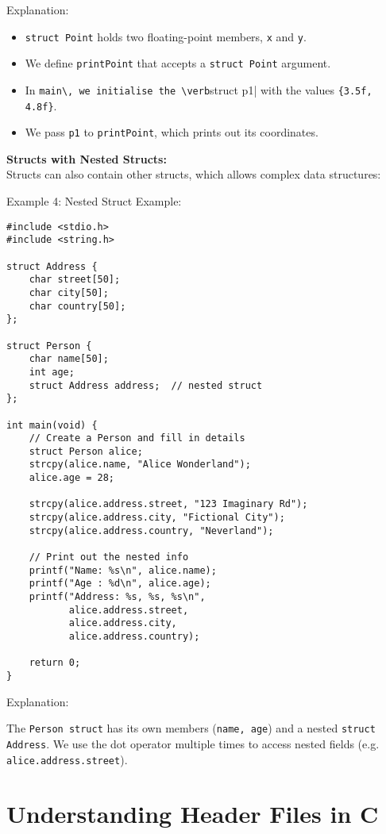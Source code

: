 \documentclass[a4paper,12pt]{article}
\begin{document}
Explanation:

\begin{itemize}
    \item \verb|struct Point| holds two floating-point members, \verb|x| and \verb|y|.
    \item We define \verb|printPoint| that accepts a \verb|struct Point| argument.
    \item In \verb|main\, we initialise the \verb|struct p1| with the values \verb|{3.5f, 4.8f}|.
    \item We pass \verb|p1| to \verb|printPoint|, which prints out its coordinates.
\end{itemize}

\textbf{Structs with Nested Structs:}\\
Structs can also contain other structs, which allows complex data structures:

\newpage

Example 4: Nested Struct Example:

\begin{lstlisting}[caption={A struct that contains another struct}, label={lst:nested-struct}]
#include <stdio.h>
#include <string.h>

struct Address {
    char street[50];
    char city[50];
    char country[50];
};

struct Person {
    char name[50];
    int age;
    struct Address address;  // nested struct
};

int main(void) {
    // Create a Person and fill in details
    struct Person alice;
    strcpy(alice.name, "Alice Wonderland");
    alice.age = 28;

    strcpy(alice.address.street, "123 Imaginary Rd");
    strcpy(alice.address.city, "Fictional City");
    strcpy(alice.address.country, "Neverland");

    // Print out the nested info
    printf("Name: %s\n", alice.name);
    printf("Age : %d\n", alice.age);
    printf("Address: %s, %s, %s\n",
           alice.address.street,
           alice.address.city,
           alice.address.country);

    return 0;
}
\end{lstlisting}
Explanation:

The \verb|Person struct| has its own members (\verb|name, age|) and a nested \verb|struct Address|. We use the dot operator multiple times to access nested fields (e.g. \verb|alice.address.street|).

\section*{Understanding Header Files in C}
\end{document}
